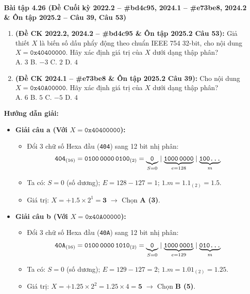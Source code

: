 \textbf{Bài tập 4.26 (Đề Cuối kỳ 2022.2 -- \#bd4c95, 2024.1 -- \#e73be8, 2024.2 \& Ôn tập 2025.2 -- Câu 39, Câu 53)}
\begin{enumerate}[label=\alph*)]
    \item \textbf{(Đề CK 2022.2, 2024.2 -- \#bd4c95 \& Ôn tập 2025.2 Câu 53):} Giả thiết $X$ là biến số dấu phẩy động theo chuẩn IEEE 754 32-bit, cho nội dung $X = \texttt{0x40400000}$. Hãy xác định giá trị của $X$ dưới dạng thập phân?\\
    A. $3$ \qquad B. $-3$ \qquad C. $2$ \qquad D. $4$
    \item \textbf{(Đề CK 2024.1 -- \#e73be8 \& Ôn tập 2025.2 Câu 39):} Cho nội dung $X = \texttt{0x40A00000}$. Hãy xác định giá trị của $X$ dưới dạng thập phân?\\
    A. $6$ \qquad B. $5$ \qquad C. $-5$ \qquad D. $4$
\end{enumerate}
\textbf{Hướng dẫn giải:}
\begin{itemize}
    \item \textbf{Giải câu a (Với $X = \texttt{0x40400000}$):}
    \begin{itemize}
        \item Đổi 3 chữ số Hexa đầu (\texttt{404}) sang 12 bit nhị phân:
        $$\texttt{404}_{(16)} = \texttt{0100\,0000\,0100}_{(2)} = \underbrace{\texttt{0}}_{S=0} \mid \underbrace{\texttt{1000\,0000}}_{e=128} \mid \underbrace{\texttt{100\dots}}_{m}$$
        \item Ta có: $S = 0$ (số dương); $E = 128 - 127 = 1$; $1.m = 1.1_{(2)} = 1.5$.
        \item Giá trị: $X = +1.5 \times 2^1 = \mathbf{3}$ $\rightarrow$ Chọn \textbf{A (3)}.
    \end{itemize}
    \item \textbf{Giải câu b (Với $X = \texttt{0x40A00000}$):}
    \begin{itemize}
        \item Đổi 3 chữ số Hexa đầu (\texttt{40A}) sang 12 bit nhị phân:
        $$\texttt{40A}_{(16)} = \texttt{0100\,0000\,1010}_{(2)} = \underbrace{\texttt{0}}_{S=0} \mid \underbrace{\texttt{1000\,0001}}_{e=129} \mid \underbrace{\texttt{010\dots}}_{m}$$
        \item Ta có: $S = 0$ (số dương); $E = 129 - 127 = 2$; $1.m = 1.01_{(2)} = 1.25$.
        \item Giá trị: $X = +1.25 \times 2^2 = 1.25 \times 4 = \mathbf{5}$ $\rightarrow$ Chọn \textbf{B (5)}.
    \end{itemize}
\end{itemize}

